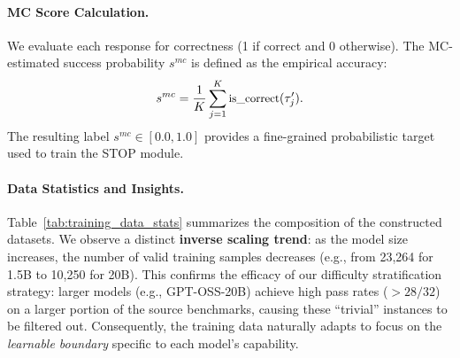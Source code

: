 \documentclass[11pt]{article}
\theoremstyle{plain}
\begin{document}
\paragraph{MC Score Calculation.}
We evaluate each response for correctness (1 if correct and 0 otherwise). The MC-estimated success probability $s^{mc}$ is defined as the empirical accuracy:
\begin{equation} \small
    s^{mc} = \frac{1}{K} \sum_{j=1}^{K} \text{is\_correct}(\tau'_{j}).
\end{equation}
The resulting label $s^{mc} \in [0.0, 1.0]$ provides a fine-grained probabilistic target used to train the STOP module.


\paragraph{Data Statistics and Insights.}
Table~\ref{tab:training_data_stats} summarizes the composition of the constructed datasets. 
We observe a distinct \textbf{inverse scaling trend}: as the model size increases, the number of valid training samples decreases (e.g., from 23,264 for 1.5B to 10,250 for 20B). 
This confirms the efficacy of our difficulty stratification strategy: larger models (e.g., GPT-OSS-20B) achieve high pass rates ($>28/32$) on a larger portion of the source benchmarks, causing these ``trivial'' instances to be filtered out. Consequently, the training data naturally adapts to focus on the \textit{learnable boundary} specific to each model's capability.

\end{document}

